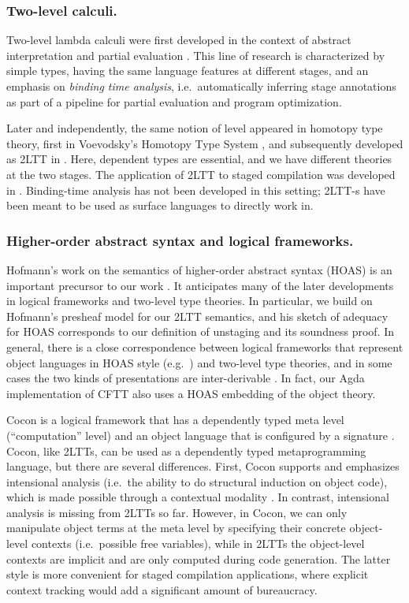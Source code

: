\documentclass[acmsmall]{acmart}
\theoremstyle{remark}
\begin{document}
\subsubsection*{Two-level calculi.}
Two-level lambda calculi were first developed in the context of abstract
interpretation and partial evaluation
\cite{DBLP:phd/ethos/Nielson84a,DBLP:books/daglib/0071307}.  This line of
research is characterized by simple types, having the same language features at
different stages, and an emphasis on \emph{binding time analysis},
i.e.\ automatically inferring stage annotations as part of a pipeline for
partial evaluation and program optimization.

Later and independently, the same notion of level appeared in homotopy type
theory, first in Voevodsky's Homotopy Type System \cite{hts}, and subsequently
developed as 2LTT in \cite{twolevel}. Here, dependent types are essential, and
we have different theories at the two stages. The application of 2LTT to staged
compilation was developed in \cite{staged2ltt}. Binding-time analysis has not
been developed in this setting; 2LTT-s have been meant to be used as surface
languages to directly work in.

\subsubsection*{Higher-order abstract syntax and logical frameworks.}
Hofmann's work on the semantics of higher-order abstract syntax (HOAS) is an
important precursor to our work \cite{Hofmann:1999:SAH:788021.788940}. It
anticipates many of the later developments in logical frameworks and two-level
type theories. In particular, we build on Hofmann's presheaf model for our 2LTT
semantics, and his sketch of adequacy for HOAS corresponds to our definition of
unstaging and its soundness proof. In general, there is a close correspondence
between logical frameworks that represent object languages in HOAS style
(e.g.\ \cite{Harper93lf}) and two-level type theories, and in some cases the two
kinds of presentations are inter-derivable \cite[Section
  3.3]{DBLP:journals/corr/abs-2302-08837}. In fact, our Agda implementation
of CFTT also uses a HOAS embedding of the object theory.

Cocon is a logical framework that has a dependently typed meta level
(``computation'' level) and an object language that is configured by a signature
\cite{DBLP:journals/corr/abs-1901-03378}. Cocon, like 2LTTs, can be used as a
dependently typed metaprogramming language, but there are several
differences. First, Cocon supports and emphasizes intensional analysis
(i.e.\ the ability to do structural induction on object code), which is made
possible through a contextual modality \cite{nanevski2008contextual}. In
contrast, intensional analysis is missing from 2LTTs so far. However, in Cocon,
we can only manipulate object terms at the meta level by specifying their
concrete object-level contexts (i.e.\ possible free variables), while in 2LTTs
the object-level contexts are implicit and are only computed during code
generation. The latter style is more convenient for staged compilation
applications, where explicit context tracking would add a significant amount of
bureaucracy.
\end{document}
